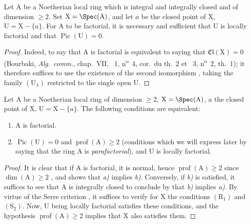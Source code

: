 \begin{corollary}[21.6.13]
\label{IV.21.6.13}
Let $\mathrm{A}$ be a Noetherian local ring which is integral and integrally closed and of dimension $\geq 2$.
Set $\mathrm{X}=\Spec(\mathrm{A})$, and let $a$ be the closed point of $\mathrm{X}$, $\mathrm{U}=\mathrm{X}-\{a\}$.
For $\mathrm{A}$ to be factorial, it is necessary and sufficient that $\mathrm{U}$ is locally factorial and that $\operatorname{Pic}(\mathrm{U})=0$.
\end{corollary}

\begin{proof}
Indeed, to say that $\mathrm{A}$ is factorial is equivalent to saying that $\mathfrak{Cl}(\mathrm{X})=0$ (Bourbaki, \emph{Alg.\ comm.}, chap.~VII, \textsection~1, n\textsuperscript{o}~4, cor.\ du th.~2 et \textsection~3, n\textsuperscript{o}~2, th.~1);
it therefore suffices to use the existence of the second isomorphism , taking the family $(\mathrm{U}_\lambda)$ restricted to the single open $\mathrm{U}$.
\end{proof}

\begin{corollary}[21.6.14]
\label{IV.21.6.14}
Let $\mathrm{A}$ be a Noetherian local ring of dimension $\geq 2$, $\mathrm{X}=\Spec(\mathrm{A})$, $a$ the closed point of $\mathrm{X}$, $\mathrm{U}=\mathrm{X}-\{a\}$.
The following conditions are equivalent:
\begin{enumerate}[label=\emph{\alph*)}]
  \item $\mathrm{A}$ is factorial.
  \item $\operatorname{Pic}(\mathrm{U})=0$ and $\operatorname{prof}(\mathrm{A})\geq 2$ (conditions which we will express later  by saying that the ring $\mathrm{A}$ is \emph{parafactorial}), and $\mathrm{U}$ is locally factorial.
\end{enumerate}
\end{corollary}

\begin{proof}
It is clear that if $\mathrm{A}$ is factorial, it is normal, hence $\operatorname{prof}(\mathrm{A})\geq 2$ since $\dim(\mathrm{A})\geq 2$ , and  shows that \emph{a)} implies \emph{b)}.
Conversely, if \emph{b)} is satisfied, it suffices to see that $\mathrm{A}$ is integrally closed to conclude by  that \emph{b)} implies \emph{a)}.
By virtue of the Serre criterion , it suffices to verify for $\mathrm{X}$ the conditions $(\mathrm{R}_1)$ and $(\mathrm{S}_2)$.
Now, $\mathrm{U}$ being locally factorial satisfies these conditions, and the hypothesis $\operatorname{prof}(\mathrm{A})\geq 2$ implies that $\mathrm{X}$ also satisfies them.
\end{proof}


